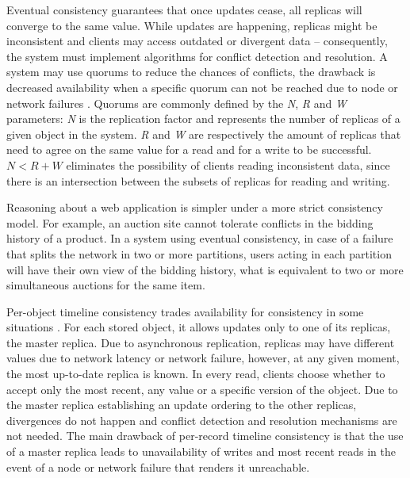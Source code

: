 \documentclass[doublespacing]{bmcart}
\begin{document}
Eventual consistency guarantees that once updates cease, all replicas will
converge to the same value. While updates are happening, replicas might be
inconsistent and clients may access outdated or divergent data -- consequently,
the system must implement algorithms for conflict detection and resolution. A
system may use quorums to reduce the chances of conflicts, the drawback is
decreased availability when a specific quorum can not be reached due to node or
network failures \cite{Vogels2009}.  Quorums are commonly defined by the
\textit{N}, \textit{R} and \textit{W} parameters: \textit{N} is the replication
factor and represents the number of replicas of a given object in the system.
\textit{R} and \textit{W} are respectively the amount of replicas that need to
agree on the same value for a read and for a write to be successful.  $N < R +
W$ eliminates the possibility of clients reading inconsistent data, since there
is an intersection between the subsets of replicas for reading and writing.

Reasoning about a web application is simpler under a more strict consistency
model. For example, an auction site cannot tolerate conflicts in the bidding
history of a product. In a system using eventual consistency, in case of a
failure that splits the network in two or more partitions, users acting in each
partition will have their own view of the bidding history, what is equivalent
to two or more simultaneous auctions for the same item.

Per-object timeline consistency trades availability for consistency in some
situations \cite{Cooper2008}. For each stored object, it allows updates only to
one of its replicas, the master replica. Due to asynchronous replication,
replicas may have different values due to network latency or network failure,
however, at any given moment, the most up-to-date replica is known. In every
read, clients choose whether to accept only the most recent, any value or a
specific version of the object. Due to the master replica establishing an
update ordering to the other replicas, divergences do not happen and conflict
detection and resolution mechanisms are not needed. The main drawback of
per-record timeline consistency is that the use of a master replica leads to
unavailability of writes and most recent reads in the event of a node or
network failure that renders it unreachable.
\end{document}

